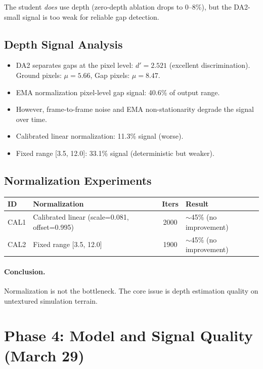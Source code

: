 \documentclass[11pt,a4paper]{article}
\begin{document}
The student \emph{does} use depth (zero-depth ablation drops to 0--8\%),
but the DA2-small signal is too weak for reliable gap detection.

\subsection{Depth Signal Analysis}

\begin{itemize}[nosep]
  \item DA2 separates gaps at the pixel level: $d'=2.521$ (excellent
        discrimination). Ground pixels: $\mu=5.66$, Gap pixels: $\mu=8.47$.
  \item EMA normalization pixel-level gap signal: 40.6\% of output range.
  \item However, frame-to-frame noise and EMA non-stationarity degrade the
        signal over time.
  \item Calibrated linear normalization: 11.3\% signal (worse).
  \item Fixed range [3.5, 12.0]: 33.1\% signal (deterministic but weaker).
\end{itemize}

\subsection{Normalization Experiments}

\begin{center}
\begin{tabular}{l l c l}
\toprule
ID & Normalization & Iters & Result \\
\midrule
CAL1 & Calibrated linear (scale=0.081, offset=0.995) & 2000 & $\sim$45\% (no improvement) \\
CAL2 & Fixed range [3.5, 12.0] & 1900 & $\sim$45\% (no improvement) \\
\bottomrule
\end{tabular}
\end{center}

\paragraph{Conclusion.}  Normalization is not the bottleneck.  The core issue
is depth estimation quality on untextured simulation terrain.

\section{Phase 4: Model and Signal Quality (March 29)}
\label{sec:phase4}
\end{document}
